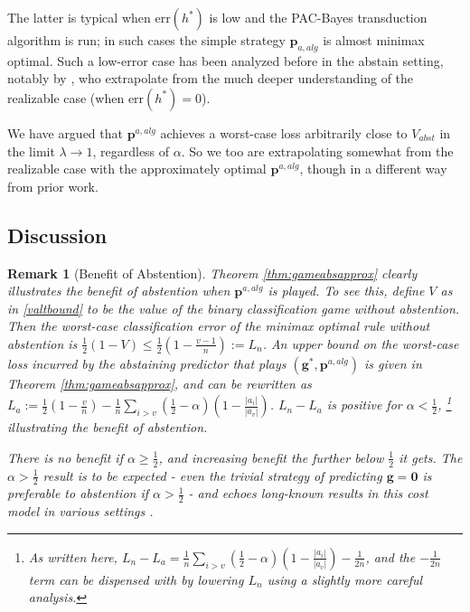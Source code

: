 \documentclass{article}[12pt]
\theoremstyle{named}
\newtheorem{nremark}{Remark}
\newcommand{\vg}{\mathbf{g}}    %
\newcommand{\vp}{\mathbf{p}}
\newcommand{\vzero}{\mathbf{0}}
\newcommand{\abs}[1]{\left| #1 \right|}
\newcommand{\err}[1]{\mbox{err}\left(#1\right)}
\newcommand*{\qedinpw}{\hfill\ensuremath{\square}} %
\newcommand{\lrp}[1]{\left(#1\right)}
\begin{document}
The latter is typical when $\err{h^*}$ is low and the PAC-Bayes transduction algorithm is run; 
in such cases the simple strategy $\vp_{a,alg}$ is almost minimax optimal. 
Such a low-error case has been analyzed before in the abstain setting, notably by \cite{EYW11}, 
who extrapolate from the much deeper understanding of the realizable case (when $\err{h^*} = 0$).

We have argued that $\vp^{a,alg}$ achieves a worst-case loss arbitrarily close to $V_{abst}$ in the limit $\lambda \to 1$, 
regardless of $\alpha$. 
So we too are extrapolating somewhat from the realizable case with the approximately optimal $\vp^{a,alg}$, 
though in a different way from prior work.



\subsection{Discussion}
\label{sec:abstgamediscussion} 

\begin{nremark}[Benefit of Abstention]
Theorem \ref{thm:gameabsapprox} clearly illustrates the benefit of abstention when $\vp^{a,alg}$ is played. 
To see this, define $V$ as in \eqref{valtbound} to be the value of the binary classification game without abstention. 
Then the worst-case classification error of the minimax optimal rule without abstention is 
$\frac{1}{2} \lrp{1 - V} \leq \frac{1}{2} \lrp{1 - \frac{v-1}{n}} := L_n$. 
An upper bound on the worst-case loss incurred by the abstaining predictor that plays $(\vg^*, \vp^{a,alg})$ 
is given in Theorem \ref{thm:gameabsapprox}, 
and can be rewritten as 
$L_a := \frac{1}{2} \lrp{1 - \frac{v}{n} } - \frac{1}{n} \sum_{i>v} \lrp{ \frac{1}{2} - \alpha } \lrp{1 - \frac{\abs{a_i}}{\abs{a_v}} } $. 
$L_n - L_a$ is positive for $\alpha < \frac{1}{2}$, 
\footnote{As written here, $L_n - L_a = \frac{1}{n} \sum_{i>v} \lrp{ \frac{1}{2} - \alpha } \lrp{1 - \frac{\abs{a_i}}{\abs{a_v}} } - \frac{1}{2n}$, 
and the $-\frac{1}{2n}$ term can be dispensed with by lowering $L_n$ using a slightly more careful analysis.}
illustrating the benefit of abstention.

There is no benefit if $\alpha \geq \frac{1}{2}$, 
and increasing benefit the further below $\frac{1}{2}$ it gets. 
The $\alpha > \frac{1}{2}$ result is to be expected - 
even the trivial strategy of predicting $\vg = \vzero$ 
is preferable to abstention if $\alpha > \frac{1}{2}$ - 
and echoes long-known results in this cost model in various settings \cite{C70}.
\end{nremark}
\end{document}
